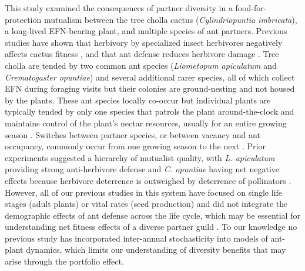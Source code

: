 \documentclass[11pt]{article}
\begin{document}
This study examined the consequences of partner diversity in a food-for-protection mutualism between the tree cholla cactus (\textit{Cylindriopuntia imbricata}), a long-lived EFN-bearing plant, and multiple species of ant partners.
Previous studies have shown that herbivory by specialized insect herbivores negatively affects cactus fitness \cite{Miller2009}, and that ant defense reduces herbivore damage \cite{Miller2007}. 
Tree cholla are tended by two common ant species (\textit{Liometopum apiculatum} and \textit{Crematogaster opuntiae}) and several additional rarer species, all of which collect EFN during foraging visits but their colonies are ground-nesting and not housed by the plants. 
These ant species locally co-occur but individual plants are typically tended by only one species that patrols the plant around-the-clock and maintains control of the plant's nectar resources, usually for an entire growing season \citep{Ohm2014, Donald2022}. 
Switches between partner species, or between vacancy and ant occupancy, commonly occur from one growing season to the next \citep{Miller2007}. 
Prior experiments suggested a hierarchy of mutualist quality, with \textit{L. apiculatum} providing strong anti-herbivore defense and \textit{C. opuntiae} having net negative effects because herbivore deterrence is outweighed by deterrence of pollinators \citep{Miller2007,Ohm2014}. 
However, all of our previous studies in this system have focused on single life stages (adult plants) or vital rates (seed production) and did not integrate the demographic effects of ant defense across the life cycle, which may be essential for understanding net fitness effects of a diverse partner guild \citep[e.g.,][]{Palmer2010}. 
To our knowledge no previous study has incorporated inter-annual stochasticity into models of ant-plant dynamics, which limits our understanding of diversity benefits that may arise through the portfolio effect. 
\end{document}
